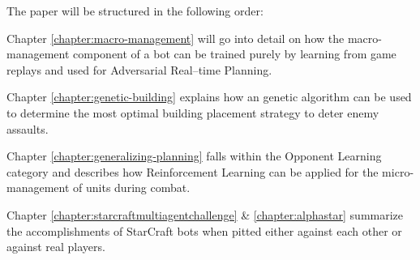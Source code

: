 The paper will be structured in the following order:

Chapter \ref{chapter:macro-management} will go into detail on how the macro-management component of a bot can be trained purely by learning from game replays and used for Adversarial Real–time Planning.

Chapter \ref{chapter:genetic-building} explains how an genetic algorithm can be used to determine the most optimal building placement strategy to deter enemy assaults.

Chapter \ref{chapter:generalizing-planning} falls within the Opponent Learning category and describes how Reinforcement Learning can be applied for the micro-management of units during combat.

Chapter \ref{chapter:starcraftmultiagentchallenge} \& \ref{chapter:alphastar} summarize the accomplishments of StarCraft bots when pitted either against each other or against real players.

